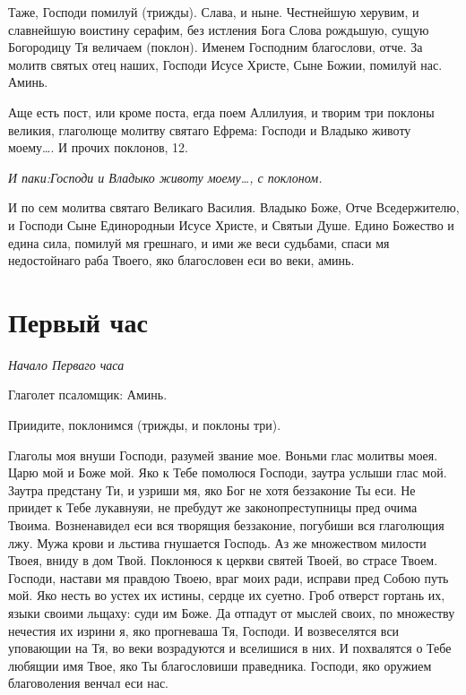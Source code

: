 Таже, Господи помилуй (трижды). Слава, и ныне. Честнейшую херувим, и славнейшую воистину серафим, без истления Бога Слова рождьшую, сущую Богородицу Тя величаем (поклон). Именем Господним благослови, отче. За молитв святых отец наших, Господи Исусе Христе, Сыне Божии, помилуй нас. Аминь.


Аще есть пост, или кроме поста, егда поем Аллилуия, и творим три поклоны великия, глаголюще молитву святаго Ефрема: Господи и Владыко животу моему…. И прочих поклонов, 12.


\itshape И паки:\normalfont{}Господи и Владыко животу моему…, с поклоном. 

И по сем молитва святаго Великаго Василия. Владыко Боже, Отче Вседержителю, и Господи Сыне Единородныи Исусе Христе, и Святыи Душе. Едино Божество и едина сила, помилуй мя грешнаго, и ими же веси судьбами, спаси мя недостойнаго раба Твоего, яко благословен еси во веки, аминь.


\section{Первый час}
 


\itshape Начало Перваго часа 


Глаголет псаломщик:\normalfont{} Аминь.

Приидите, поклонимся (трижды, и поклоны три).




Глаголы моя внуши Господи, разумей звание мое. Воньми глас молитвы моея. Царю мой и Боже мой. Яко к Тебе помолюся Господи, заутра услыши глас мой. Заутра предстану Ти, и узриши мя, яко Бог не хотя беззаконие Ты еси. Не приидет к Тебе лукавнуяи, не пребудут же законопреступницы пред очима Твоима. Возненавидел еси вся творящия беззаконие, погубиши вся глаголющия лжу. Мужа крови и льстива гнушается Господь. Аз же множеством милости Твоея, вниду в дом Твой. Поклонюся к церкви святей Твоей, во страсе Твоем. Господи, настави мя правдою Твоею, враг моих ради, исправи пред Собою путь мой. Яко несть во устех их истины, сердце их суетно. Гроб отверст гортань их, языки своими льщаху: суди им Боже. Да отпадут от мыслей своих, по множеству нечестия их изрини я, яко прогневаша Тя, Господи. И возвеселятся вси уповающии на Тя, во веки возрадуются и вселишися в них. И похвалятся о Тебе любящии имя Твое, яко Ты благословиши праведника. Господи, яко оружием благоволения венчал еси нас.


